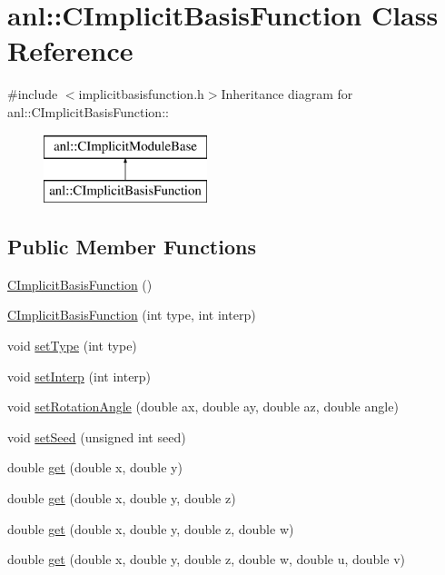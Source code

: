 \hypertarget{classanl_1_1CImplicitBasisFunction}{
\section{anl::CImplicitBasisFunction Class Reference}
\label{classanl_1_1CImplicitBasisFunction}
}


{\ttfamily \#include $<$implicitbasisfunction.h$>$}Inheritance diagram for anl::CImplicitBasisFunction::\begin{figure}[H]
\begin{center}
\leavevmode
\includegraphics[height=2cm]{classanl_1_1CImplicitBasisFunction}
\end{center}
\end{figure}
\subsection*{Public Member Functions}
\begin{DoxyCompactItemize}
\item 
\hyperlink{classanl_1_1CImplicitBasisFunction_a9ccd8c95dfb0fd9cbe2b61ff763fa7d0}{CImplicitBasisFunction} ()
\item 
\hyperlink{classanl_1_1CImplicitBasisFunction_af04b35601b62b2107e05ff4a7a1a58b6}{CImplicitBasisFunction} (int type, int interp)
\item 
void \hyperlink{classanl_1_1CImplicitBasisFunction_ae265237f2d9340a2add93c0710d6fbfd}{setType} (int type)
\item 
void \hyperlink{classanl_1_1CImplicitBasisFunction_a24b23da12397b34651e07b637e6b7de4}{setInterp} (int interp)
\item 
void \hyperlink{classanl_1_1CImplicitBasisFunction_ac3d28901ee0c7fb3e66100b5da63b22b}{setRotationAngle} (double ax, double ay, double az, double angle)
\item 
void \hyperlink{classanl_1_1CImplicitBasisFunction_a1fba23e4d106edd9cdc44dd52e116d2d}{setSeed} (unsigned int seed)
\item 
double \hyperlink{classanl_1_1CImplicitBasisFunction_a78231e212255d16f3c99edd7107ae2da}{get} (double x, double y)
\item 
double \hyperlink{classanl_1_1CImplicitBasisFunction_af4ae388cbc87477600c5d24c2450366b}{get} (double x, double y, double z)
\item 
double \hyperlink{classanl_1_1CImplicitBasisFunction_a5dab3e931e2bffd223301ada4e9080ef}{get} (double x, double y, double z, double w)
\item 
double \hyperlink{classanl_1_1CImplicitBasisFunction_a7841eca7a861e9bc6885b7a1c316c4df}{get} (double x, double y, double z, double w, double u, double v)
\end{DoxyCompactItemize}
